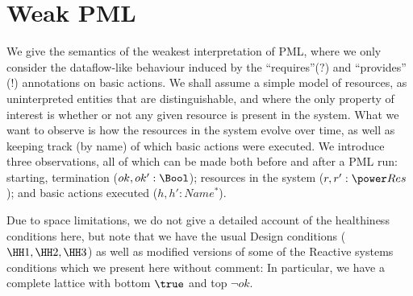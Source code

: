 \section{Weak PML}\label{ha:WeakPML}

We give the semantics of the weakest interpretation of PML,
where we only consider the dataflow-like behaviour induced
by the ``requires''($?$) and ``provides'' ($!$) annotations on basic actions.
We shall assume a simple model of resources,
as uninterpreted entities that are distinguishable,
and where the only property of interest is whether or not any given
resource is present in the system.
What we want to observe is how the resources in the system
evolve over time, as well as keeping track (by name)
of which basic actions were executed.
We introduce three observations,
all of which can be made both before and after a PML run:
starting, termination ($ok,ok' : \Bool$);
resources in the system ($r,r' : \power Res$);
and basic actions executed ($h,h' : Name^*$).

Due to space limitations,
we do not give a detailed account of the healthiness conditions here,
but note that we have the usual Design conditions ($\HH1,\HH2,\HH3$)
as well as modified versions of some of the Reactive systems conditions\cite[Chp 8]{Hoare-He98}
which we present here without comment:
In particular, we have a complete lattice with bottom $\true$
and top $\lnot ok$.

